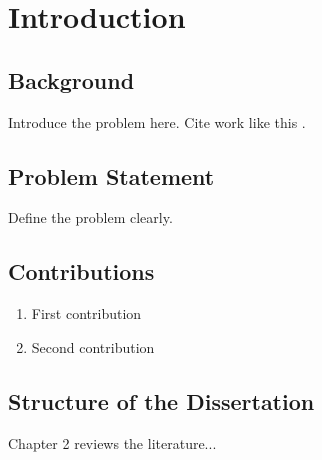 \section{Introduction}

\subsection{Background}

Introduce the problem here. Cite work like this \cite{exampleRef}.

\subsection{Problem Statement}

Define the problem clearly.

\subsection{Contributions}

\begin{enumerate}
    \item First contribution
    \item Second contribution
\end{enumerate}

\subsection{Structure of the Dissertation}

Chapter 2 reviews the literature...
